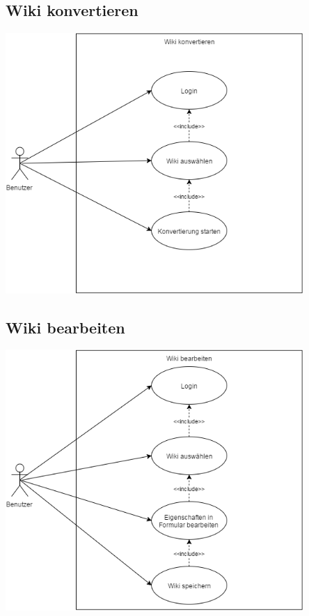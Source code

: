 \label{app:use_case_diagramm}

	\subsection{Wiki konvertieren}
	\begin{center}
	\includegraphics[width=0.85\textwidth]{images/UC_wiki_konvertieren}	
	\end{center}
	
	\subsection{Wiki bearbeiten}
	\begin{center}
	\includegraphics[width=0.85\textwidth]{images/UC_wiki_bearbeiten}	
	\end{center}